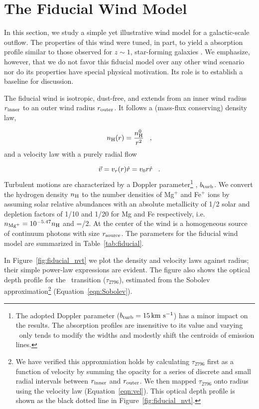 \documentclass[12pt,preprint]{aastex}
\begin{document}
\section{The Fiducial Wind Model}
\label{sec:fiducial}

In this section, we study a simple yet illustrative wind model for
a galactic-scale outflow.  The properties of this wind were tuned, in
part, to yield a  absorption profile 
similar to those observed for $z \sim 1$, star-forming galaxies
\citep{wcp+09,rubin+10c}.  We emphasize, however, that we do not
favor this fiducial model over any other wind scenario nor do its
properties have special physical motivation.
Its role is to establish a baseline
for discussion.

The fiducial wind is isotropic, dust-free, and extends from an inner wind
radius $r_{\rm inner}$ to an outer wind radius $r_{\rm outer}$.  
It follows a (mass-flux conserving) density law,

\begin{equation}
n_{\rm H} (r) = \frac{n^0_{\rm H}}{r^2} \;\;\; , 
\label{eqn:density}
\end{equation}
and a velocity law with a purely radial flow

\begin{equation}
\vec v = v_r (r) \hat r = v_0 r \hat r  \;\;\; .
\label{eqn:vel}
\end{equation}
Turbulent motions are
characterized by a Doppler parameter\footnote{
  The adopted Doppler parameter
  ($b_{\rm turb} = 15 \, {\rm km~s^{-1}}$) has a minor impact on the results.
  The absorption profiles are insensitive to its value and varying \bturb\
  only tends to modify the widths and modestly
  shift the centroids of emission lines.} 
, $b_{\rm turb}$.  
We convert the hydrogen density $n_{\rm H}$ to the number densities of
Mg$^+$ and Fe$^+$ ions by assuming solar relative abundances with an
absolute metallicity of 1/2 solar and depletion factors of 1/10 and
1/20 for Mg and Fe respectively, i.e.\  $n_{\rm Mg^+} = 10^{-5.47} n_{\rm H}$ 
and \nfe=\nmg/2. At the center of the wind is a homogeneous source of
continuum photons with size $r_{\rm source}$. The parameters for the
fiducial wind model are summarized in Table~\ref{tab:fiducial}.   

In Figure~\ref{fig:fiducial_nvt} we plot the density and velocity
laws against radius;  
their simple power-law expressions are evident.  The figure also
shows the optical depth profile for the \mgiia\ transition
($\tau_{2796}$), estimated from the Sobolev approximation\footnote{We
  have verified this approxmiation holds by calculating 
  $\tau_{2796}$ first
  as a function of velocity by summing the opacity for a series of
  discrete and small radial intervals
  between $r_{\rm inner}$  and $r_{\rm outer}$.   We then mapped
  $\tau_{2796}$ onto radius using the velocity law
  (Equation~\ref{eqn:vel}). This optical depth profile is shown as the
black dotted line in Figure~\ref{fig:fiducial_nvt}.}
(Equation~\ref{eqn:Sobolev}). 
\end{document}
